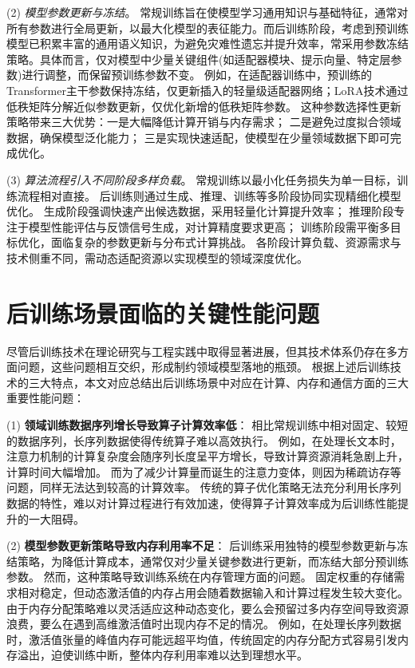 (2) \textit{模型参数更新与冻结}。
常规训练旨在使模型学习通用知识与基础特征，通常对所有参数进行全局更新，以最大化模型的表征能力。而后训练阶段，考虑到预训练模型已积累丰富的通用语义知识，为避免灾难性遗忘并提升效率，常采用参数冻结策略。具体而言，仅对模型中少量关键组件(如适配器模块、提示向量、特定层参数)进行调整，而保留预训练参数不变。
例如，在适配器训练中，预训练的Transformer主干参数保持冻结，仅更新插入的轻量级适配器网络；LoRA技术通过低秩矩阵分解近似参数更新，仅优化新增的低秩矩阵参数。
这种参数选择性更新策略带来三大优势：一是大幅降低计算开销与内存需求；
二是避免过度拟合领域数据，确保模型泛化能力；
三是实现快速适配，使模型在少量领域数据下即可完成优化。

(3) \textit{算法流程引入不同阶段多样负载}。 
常规训练以最小化任务损失为单一目标，训练流程相对直接。
后训练则通过生成、推理、训练等多阶段协同实现精细化模型优化。
生成阶段强调快速产出候选数据，采用轻量化计算提升效率；
推理阶段专注于模型性能评估与反馈信号生成，对计算精度要求更高；
训练阶段需平衡多目标优化，面临复杂的参数更新与分布式计算挑战。
各阶段计算负载、资源需求与技术侧重不同，需动态适配资源以实现模型的领域深度优化。 



\section{后训练场景面临的关键性能问题}

尽管后训练技术在理论研究与工程实践中取得显著进展，但其技术体系仍存在多方面问题，这些问题相互交织，形成制约领域模型落地的瓶颈。
根据上述后训练技术的三大特点，本文对应总结出后训练场景中对应在计算、内存和通信方面的三大重要性能问题：

(1) \textbf{领域训练数据序列增长导致算子计算效率低}：
相比常规训练中相对固定、较短的数据序列，长序列数据使得传统算子难以高效执行。
例如，在处理长文本时，注意力机制的计算复杂度会随序列长度呈平方增长，导致计算资源消耗急剧上升，计算时间大幅增加。
而为了减少计算量而诞生的注意力变体，则因为稀疏访存等问题，同样无法达到较高的计算效率。
传统的算子优化策略无法充分利用长序列数据的特性，难以对计算过程进行有效加速，使得算子计算效率成为后训练性能提升的一大阻碍。

(2) \textbf{模型参数更新策略导致内存利用率不足}：
后训练采用独特的模型参数更新与冻结策略，为降低计算成本，通常仅对少量关键参数进行更新，而冻结大部分预训练参数。
然而，这种策略导致训练系统在内存管理方面的问题。
固定权重的存储需求相对稳定，但动态激活值的内存占用会随着数据输入和计算过程发生较大变化。
由于内存分配策略难以灵活适应这种动态变化，要么会预留过多内存空间导致资源浪费，要么在遇到高维激活值时出现内存不足的情况。
例如，在处理长序列数据时，激活值张量的峰值内存可能远超平均值，传统固定的内存分配方式容易引发内存溢出，迫使训练中断，整体内存利用率难以达到理想水平。

